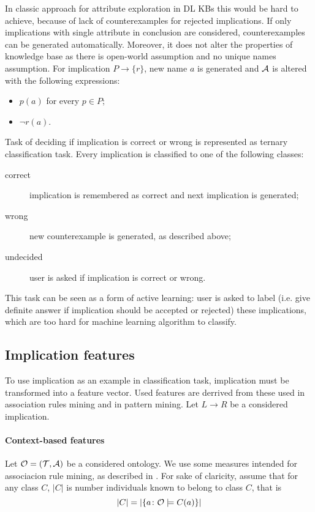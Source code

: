\documentclass{llncs}
\newcommand{\ont}{\ensuremath\mathcal{O}}
\newcommand{\tbox}{\ensuremath\mathcal{T}}
\newcommand{\abox}{\ensuremath\mathcal{A}}
\begin{document}
In classic approach for attribute exploration in DL KBs this would be hard to achieve, because of lack of counterexamples for rejected implications. If only implications with single attribute in conclusion are considered, counterexamples can be generated automatically. Moreover, it does not alter the properties of knowledge base as there is open-world assumption and no unique names assumption. For implication $P\to\{r\}$, new name $a$ is generated and $\abox$ is altered with the following expressions:
\begin{itemize}
\item $p(a)$ for every $p\in P$;
\item $\lnot r(a)$.
\end{itemize}

Task of deciding if implication is correct or wrong is represented as ternary classification task. Every implication is classified to one of the following classes:
\begin{description}
\item[correct] implication is remembered as correct and next implication is generated;
\item[wrong] new counterexample is generated, as described above;
\item[undecided] user is asked if implication is correct or wrong. 
\end{description}
This task can be seen as a form of active learning: user is asked to label
(i.e. give definite answer if implication should be accepted or rejected) these
implications, which are too hard for machine learning algorithm to classify.

\subsection{Implication features}

To use implication as an example in classification task, implication must be
transformed into a feature vector. Used features are derrived from these used
in association rules mining and in pattern mining. Let $L\to R$ be a considered
implication.

\paragraph{Context-based features} Let $\ont=(\tbox,\abox)$ be a considered
ontology. We use some measures intended for
associacion rule mining, as described in \cite{lebras}. For sake of claricity,
assume that for any class $C$, $\left|C\right|$ is number individuals known to belong to class $C$, that is
\[ \left|C\right|=\left|\{a\colon \ont\models C(a)\}\right|\]
\end{document}
